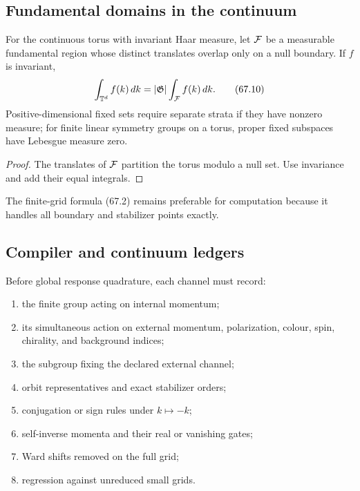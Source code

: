\documentclass[11pt]{article}
\begin{document}
\subsection{Fundamental domains in the continuum}

For the continuous torus with invariant Haar measure, let
\({\cal F}\) be a measurable fundamental region whose distinct
translates overlap only on a null boundary.  If \(f\) is invariant,
\[
                         \int_{\mathbb T^d}f(k)\,dk
                    =|{\mathfrak G}|\int_{\cal F}f(k)\,dk.    \tag{67.10}
\]
Positive-dimensional fixed sets require separate strata if they have
nonzero measure; for finite linear symmetry groups on a torus, proper
fixed subspaces have Lebesgue measure zero.

\begin{proof}
The translates of \({\cal F}\) partition the torus modulo a null set.
Use invariance and add their equal integrals.
\end{proof}

The finite-grid formula (67.2) remains preferable for computation
because it handles all boundary and stabilizer points exactly.

\subsection{Compiler and continuum ledgers}

\begin{ledger}
\label{led:v11v67-data}
Before global response quadrature, each channel must record:
\begin{enumerate}
\item the finite group acting on internal momentum;
\item its simultaneous action on external momentum, polarization,
colour, spin, chirality, and background indices;
\item the subgroup fixing the declared external channel;
\item orbit representatives and exact stabilizer orders;
\item conjugation or sign rules under \(k\mapsto-k\);
\item self-inverse momenta and their real or vanishing gates;
\item Ward shifts removed on the full grid;
\item regression against unreduced small grids.
\end{enumerate}
\end{ledger}
\end{document}
